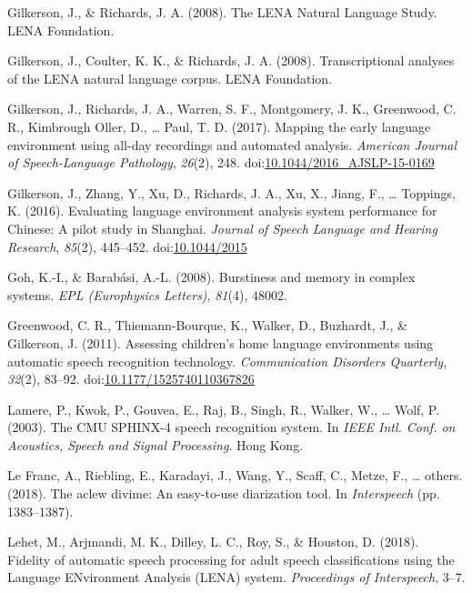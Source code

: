 \documentclass[english,floatsintext,man]{apa6}
\begin{document}
\hypertarget{ref-gilkerson2008lena}{}
Gilkerson, J., \& Richards, J. A. (2008). The LENA Natural Language
Study. LENA Foundation.

\hypertarget{ref-Gilkerson2008ltr6}{}
Gilkerson, J., Coulter, K. K., \& Richards, J. A. (2008).
Transcriptional analyses of the LENA natural language corpus. LENA
Foundation.

\hypertarget{ref-Gilkerson2017}{}
Gilkerson, J., Richards, J. A., Warren, S. F., Montgomery, J. K.,
Greenwood, C. R., Kimbrough Oller, D., \ldots{} Paul, T. D. (2017).
Mapping the early language environment using all-day recordings and
automated analysis. \emph{American Journal of Speech-Language
Pathology}, \emph{26}(2), 248.
doi:\href{https://doi.org/10.1044/2016_AJSLP-15-0169}{10.1044/2016\_AJSLP-15-0169}

\hypertarget{ref-Gilkerson2016}{}
Gilkerson, J., Zhang, Y., Xu, D., Richards, J. A., Xu, X., Jiang, F.,
\ldots{} Toppings, K. (2016). Evaluating language environment analysis
system performance for Chinese: A pilot study in Shanghai. \emph{Journal
of Speech Language and Hearing Research}, \emph{85}(2), 445--452.
doi:\href{https://doi.org/10.1044/2015}{10.1044/2015}

\hypertarget{ref-goh2008burstiness}{}
Goh, K.-I., \& Barabási, A.-L. (2008). Burstiness and memory in complex
systems. \emph{EPL (Europhysics Letters)}, \emph{81}(4), 48002.

\hypertarget{ref-Greenwood2011}{}
Greenwood, C. R., Thiemann-Bourque, K., Walker, D., Buzhardt, J., \&
Gilkerson, J. (2011). Assessing children's home language environments
using automatic speech recognition technology. \emph{Communication
Disorders Quarterly}, \emph{32}(2), 83--92.
doi:\href{https://doi.org/10.1177/1525740110367826}{10.1177/1525740110367826}

\hypertarget{ref-lamere2003cmu}{}
Lamere, P., Kwok, P., Gouvea, E., Raj, B., Singh, R., Walker, W.,
\ldots{} Wolf, P. (2003). The CMU SPHINX-4 speech recognition system. In
\emph{IEEE Intl. Conf. on Acoustics, Speech and Signal Processing}. Hong
Kong.

\hypertarget{ref-le2018aclew}{}
Le Franc, A., Riebling, E., Karadayi, J., Wang, Y., Scaff, C., Metze,
F., \ldots{} others. (2018). The aclew divime: An easy-to-use
diarization tool. In \emph{Interspeech} (pp. 1383--1387).

\hypertarget{ref-Lehet2018}{}
Lehet, M., Arjmandi, M. K., Dilley, L. C., Roy, S., \& Houston, D.
(2018). Fidelity of automatic speech processing for adult speech
classifications using the Language ENvironment Analysis (LENA) system.
\emph{Proceedings of Interspeech}, 3--7.
\end{document}
